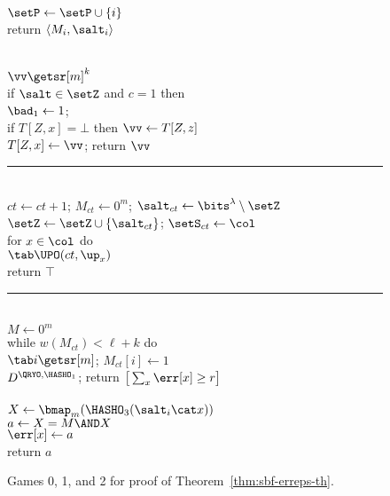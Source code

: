 \begin{figure*}
{  \\[2pt]
    $\setP \gets \setP \cup \{i\}$\\
    return $\langle M_i, \salt_i\rangle$
}
{
  \vspace{-7pt}
  \hfill{}\\[2pt]
    $\vv \getsr [m]^k$\\
    if $\salt \in \setZ$ and $c = 1$ then \\
    \tab $\bad_1 \gets 1$; \\
    if $T[Z,x] = \bot$ then $\vv \gets T[Z,z]$\\
    $T[Z,x] \gets \vv$; return $\vv$

  \vspace{6pt}\hrule\vspace{3pt}

  \oraclev{$\REPO(\col)$}\hfill{}\\[2pt]
    $ct \gets ct+1$;
    $M_{ct} \gets 0^m$;
    $\salt_{ct} \gets \bits^\lambda\setminus \setZ$\\
    $\setZ \gets \setZ \cup \{\salt_{ct}\}$;
    $\setS_{ct} \gets \col$\\
    for $x \in \col$ do\\
    $\tab\UPO(ct, \up_x)$\\
    return $\top$

  \vspace{6pt}\hrule\vspace{3pt}

  \\[2pt]
    $M \gets 0^m$\\
    while $w(M_{ct}) < \ell+k$ do\\
    $\tab i \getsr [m]$;
    $M_{ct}[i] \gets 1$\\
    $D^{\QRYO,\HASHO_1}$;
    return $\big[\sum_x \err[x] \geq r\big]$
  \\[6pt]
  \\[2pt]
    $X \gets \bmap_m(\HASHO_3(\salt_i \cat x))$\\
    $a \gets X = M \AND X$\\
    $\err[x] \gets a$\\
    return $a$
}
\caption{Games 0, 1, and 2 for proof of Theorem~\ref{thm:sbf-erreps-th}.}
\label{fig:sbf-erreps-th/games}
\end{figure*}

